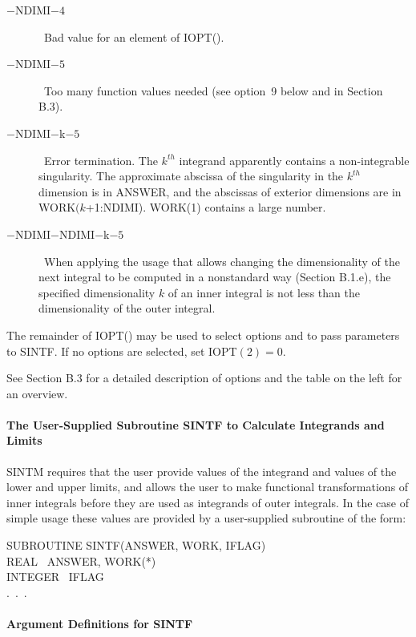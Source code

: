 \documentclass[twoside]{MATH77}
\begin{document}
\begin{description}
\begin{description}
\item[\rm $-$NDIMI$-4$] \  Bad value for an element of IOPT().

\item[\rm $-$NDIMI$-5$] \  Too many function values needed (see option~9 below and
in Section B.3).

\item[\rm $-$NDIMI$-$k$-5$] \  Error termination. The $k^{th}$ integrand
apparently contains a non-integrable singularity. The approximate abscissa
of the singularity in the $k^{th}$ dimension is in ANSWER, and the abscissas
of exterior dimensions are in WORK$(k$+1:NDIMI). WORK(1)
contains a large number.

\item[\rm $-$NDIMI$-$NDIMI$-$k$-5$] \  When applying the usage that allows
changing the dimensionality of the next integral to be computed in a
nonstandard way (Section B.1.e), the specified dimensionality $k$ of an
inner integral is not less than the dimensionality of the outer integral.
\end{description}

The remainder of IOPT() may be used to select options and to pass parameters
to SINTF. If no options are selected, set IOPT$(2)=0.$
\end{description}

See Section B.3 for a detailed description of options and the table
on the left for an overview.

\paragraph{The User-Supplied Subroutine SINTF to Calculate Integrands and
Limits\label{SINTF}}

SINTM requires that the user provide values of the integrand and values of
the lower and upper limits, and allows the user to make functional
transformations of inner integrals before they are used as integrands of
outer integrals. In the case of simple usage these values are provided by a
user-supplied subroutine of the form:

{\tt \begin{tabbing}
SUBROUTINE SINTF(ANSWER, WORK, IFLAG)\\
REAL \ ANSWER, WORK(*)\\
INTEGER \ IFLAG\\
\rm .\ .\ .
\end{tabbing}}

\paragraph{Argument Definitions for SINTF\label{ArgSINTF}}
\end{document}
